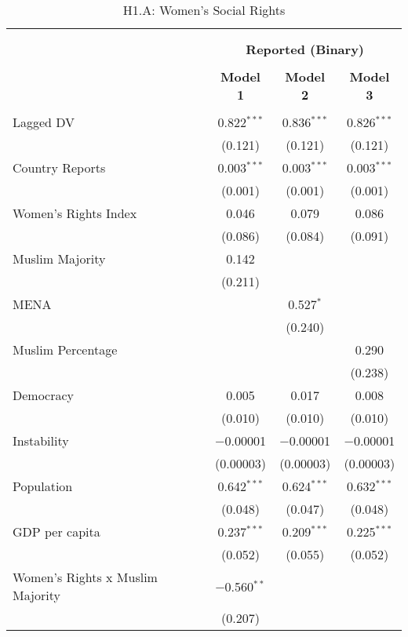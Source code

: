 
\begin{table}[!htbp] \centering 
  \caption{H1.A: Women's Social Rights} 
  \label{} 
\begin{tabular}{@{\extracolsep{5pt}}lccc} 
\\[-1.8ex]\hline \\[-1.8ex] 
\\[-1.8ex] & \multicolumn{3}{c}{\textbf{Reported (Binary)}} \\ 
\\[-1.8ex] & \textbf{Model 1} & \textbf{Model 2} & \textbf{Model 3}\\ 
\hline \\[-1.8ex] 
 Lagged DV & 0.822$^{***}$ & 0.836$^{***}$ & 0.826$^{***}$ \\ 
  & (0.121) & (0.121) & (0.121) \\ 
  Country Reports & 0.003$^{***}$ & 0.003$^{***}$ & 0.003$^{***}$ \\ 
  & (0.001) & (0.001) & (0.001) \\ 
  Women's Rights Index & 0.046 & 0.079 & 0.086 \\ 
  & (0.086) & (0.084) & (0.091) \\ 
  Muslim Majority & 0.142 &  &  \\ 
  & (0.211) &  &  \\ 
  MENA &  & 0.527$^{*}$ &  \\ 
  &  & (0.240) &  \\ 
  Muslim Percentage &  &  & 0.290 \\ 
  &  &  & (0.238) \\ 
  Democracy & 0.005 & 0.017 & 0.008 \\ 
  & (0.010) & (0.010) & (0.010) \\ 
  Instability & $-$0.00001 & $-$0.00001 & $-$0.00001 \\ 
  & (0.00003) & (0.00003) & (0.00003) \\ 
  Population & 0.642$^{***}$ & 0.624$^{***}$ & 0.632$^{***}$ \\ 
  & (0.048) & (0.047) & (0.048) \\ 
  GDP per capita & 0.237$^{***}$ & 0.209$^{***}$ & 0.225$^{***}$ \\ 
  & (0.052) & (0.055) & (0.052) \\ 
  Women's Rights x Muslim Majority & $-$0.560$^{**}$ &  &  \\ 
  & (0.207) &  &  \\ 

\end{tabular}
\end{table}
